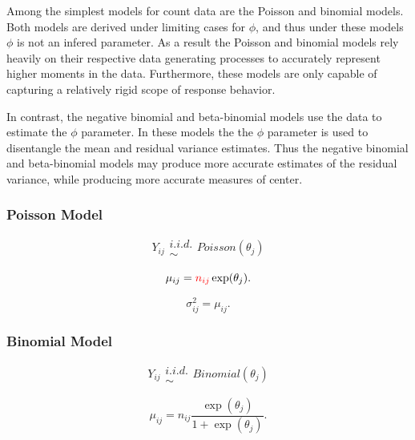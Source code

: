 \documentclass[12pt]{article}
\begin{document}
%
Among the simplest models for count data are the Poisson and binomial models. 
Both models are derived %
under limiting cases for $\phi$, and thus under these models $\phi$ is not an 
infered parameter. As a result the Poisson and binomial models rely heavily on 
their respective data generating processes to accurately represent higher 
moments in the data. Furthermore, these models are only capable of capturing a 
relatively rigid scope of response behavior.

%
In contrast, the negative binomial and beta-binomial models use the data to 
estimate the $\phi$ parameter. In these models the the $\phi$ parameter is used 
to disentangle the mean and residual variance estimates. Thus the negative 
binomial and beta-binomial models may produce more accurate estimates of the 
residual variance, while producing more accurate measures of center. 

%
\subsubsection{Poisson Model}

%
\begin{equation}
Y_{ij} \substack{i.i.d.\\\sim} Poisson(\theta_{j})
\end{equation}

\begin{equation}
\mu_{ij} = {\color{red}n_{ij}} \exp(\theta_{j}).
\end{equation}

\begin{equation}
\sigma^2_{ij} = \mu_{ij}.
\end{equation}


%
\subsubsection{Binomial Model}

%
\begin{equation}
Y_{ij} \substack{i.i.d.\\\sim} Binomial(\theta_{j})
\end{equation}

\begin{equation}
\mu_{ij} = n_{ij}\frac{\exp(\theta_{j})}{1+\exp(\theta_{j})}.
\end{equation}
\end{document}
